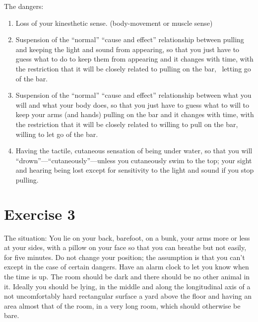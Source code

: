 The dangers: 
\begin{enumerate}
\item Loss of your kinesthetic sense. (body-movement or muscle sense) 
\item Suspension of the \enquote{normal} \enquote{cause and effect} relationship between 
pulling and keeping the light and sound from appearing, so that you just 
have to guess what to do to keep them from appearing and it changes with 
time, with the restriction that it will be closely related to pulling on the bar, 
\eg\ letting go of the bar. 
\item Suspension of the \enquote{normal} \enquote{cause and effect} relationship between what 
you will and what your body does, so that you just have to guess what to 
will to keep your arms (and hands) pulling on the bar and it changes with 
time, with the restriction that it will be closely related to willing to pull on 
the bar, \eg willing to let go of the bar. 
\item Having the tactile, cutaneous sensation of being under water, so that 
you will \enquote{drown}---\enquote{cutaneously}---unless you cutaneously swim to the top; 
your sight and hearing being lost except for sensitivity to the light and sound 
if you stop pulling. 
\end{enumerate}

\section*{Exercise 3}

The situation: You lie on your back, barefoot, on a bunk, your arms more 
or less at your sides, with a pillow on your face so that you can breathe but 
not easily, for five minutes. Do not change your position; the assumption is 
that you can't except in the case of certain dangers. Have an alarm clock 
to let you know when the time is up. The room should be dark and there 
should be no other animal in it. Ideally you should be lying, in the middle 
and along the longitudinal axis of a not uncomfortably hard rectangular 
surface a yard above the floor and having an area almost that of the room, 
in a very long room, which should otherwise be bare. 

